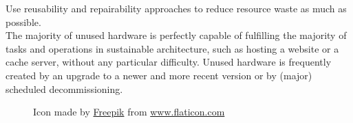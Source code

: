 Use reusability and repairability approaches to reduce resource waste as much as
possible. \\ %
The majority of unused hardware is perfectly capable of fulfilling the majority
of tasks and operations in sustainable architecture, such as hosting a website or
a cache server, without any particular difficulty. Unused hardware is frequently
created by an upgrade to a newer and more recent version or by (major) scheduled
decommissioning.

\clearpage
\newpage


\begin{figure} %
  \centering
  \def\stackalignment{r} %
  {\scriptsize \parbox[t]{\linewidth}{ Icon made by \href{https://www.flaticon.com/authors/freepik}{Freepik} from \href{http://www.flaticon.com}{www.flaticon.com} }}
\end{figure}

